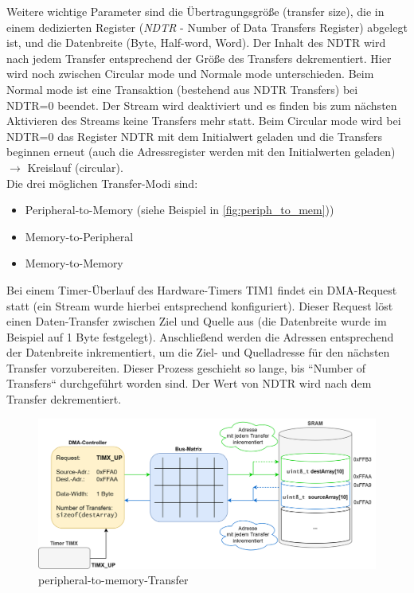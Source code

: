 \documentclass[a4paper, portrait, 12pt]{scrartcl} %
\begin{document}
Weitere wichtige Parameter sind die Übertragungsgröße (transfer size), die in einem dedizierten Register (\emph{NDTR} - Number of Data Transfers Register) abgelegt ist, und die Datenbreite (Byte, Half-word, Word). Der Inhalt des NDTR wird nach jedem Transfer entsprechend der Größe des Transfers dekrementiert. Hier wird noch zwischen Circular mode und Normale mode unterschieden. Beim Normal mode ist eine Transaktion (bestehend aus NDTR Transfers) bei NDTR=0 beendet. Der Stream wird deaktiviert und es finden bis zum nächsten Aktivieren des Streams keine Transfers mehr statt. Beim Circular mode wird bei NDTR=0 das Register NDTR mit dem Initialwert geladen und die Transfers beginnen erneut (auch die Adressregister werden mit den Initialwerten geladen) $\rightarrow$ Kreislauf (circular).\\

Die drei möglichen Transfer-Modi sind:
\begin{itemize}
	\item Peripheral-to-Memory (siehe Beispiel in \autoref{fig:periph_to_mem}))
	\item Memory-to-Peripheral
	\item Memory-to-Memory
\end{itemize}

Bei einem Timer-Überlauf des Hardware-Timers TIM1 findet ein DMA-Request statt (ein Stream wurde hierbei entsprechend konfiguriert). Dieser Request löst einen Daten-Transfer zwischen Ziel und Quelle aus (die Datenbreite wurde im Beispiel auf 1 Byte festgelegt). Anschließend werden die Adressen entsprechend der Datenbreite inkrementiert, um die Ziel- und Quelladresse für den nächsten Transfer vorzubereiten. Dieser Prozess geschieht so lange, bis ``Number of Transfers`` durchgeführt worden sind. Der Wert von NDTR wird nach dem Transfer dekrementiert.\\

\begin{figure}[H]
	\centering
    \includegraphics[scale=0.1]{Prinzip_periph2mem.png} 
	\caption{peripheral-to-memory-Transfer}
	\label{fig:periph_to_mem}
\end{figure}
\end{document}
